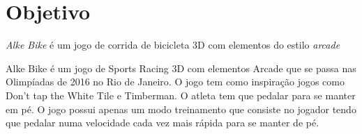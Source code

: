 \section{Objetivo} 

\textit{Alke Bike} é um jogo de corrida de bicicleta 3D com elementos do estilo \textit{arcade}

Alke Bike é um jogo de Sports Racing 3D com elementos Arcade que se passa nas Olimpíadas de 2016 no Rio de Janeiro. O jogo tem como inspiração jogos como Don't tap the White Tile e Timberman. O atleta tem que pedalar para se manter em pé. O jogo possui apenas um modo treinamento que consiste no jogador tendo que pedalar numa velocidade cada vez mais rápida para se manter de pé.
